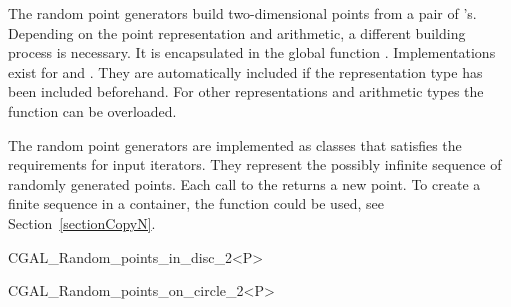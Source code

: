 
\ccCreation

The random point generators build two-dimensional points from a pair
of 's. Depending on the point representation and
arithmetic, a different building process is necessary. It is
encapsulated in the global function .
Implementations exist for  and
. They are automatically included if the
representation type  has been included beforehand.
For other representations and arithmetic types the function can be
overloaded.



The random point generators are implemented as classes that satisfies
the requirements for input iterators. They represent the possibly
infinite sequence of randomly generated points. Each call to the
 returns a new point. To create a finite sequence in a
container, the function  could be used, see
Section~\ref{sectionCopyN}.

\ccHtmlNoClassFile
\begin{ccClassTemplate}{CGAL_Random_points_in_disc_2<P>}
\end{ccClassTemplate}

\ccHtmlNoClassFile
\begin{ccClassTemplate}{CGAL_Random_points_on_circle_2<P>}
\end{ccClassTemplate}

